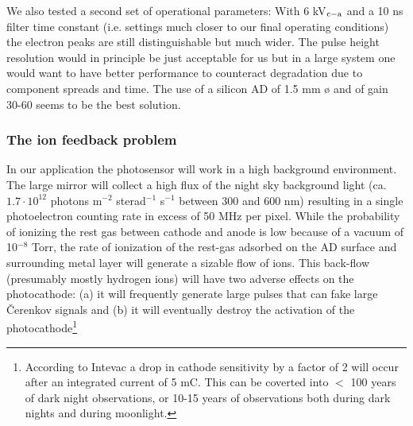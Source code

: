 
We also tested a second set of operational parameters:
With 6 kV$_{{\rm c-a}}$ and a 10 ns filter time constant (i.e.
settings much closer to our final operating conditions) the electron peaks
are still distinguishable but much wider. The pulse height resolution
would in principle be just acceptable for us but
in a large system one would want to have better performance to counteract
degradation due to component spreads and time. The use of a silicon AD of
1.5 mm {\o} and of gain 30-60 seems to be the best solution.

\subsubsection{The ion feedback problem}


\medskip In our application the photosensor will work in a high background
environment. The large mirror will collect a high flux of the night sky
background light (ca. $1.7 \cdot 10^{12}$ photons m$^{-2}$ sterad$^{-1}$ s$%
^{-1}$ between 300 and 600 nm) resulting in a single photoelectron counting
rate in excess of 50 MHz per pixel. While the probability of ionizing the rest gas
between cathode and anode is low because of a vacuum of 10$^{-8}$ Torr, the
rate of ionization of the rest-gas adsorbed on the AD surface and
surrounding metal layer will generate a sizable flow of ions. This
back-flow (presumably mostly hydrogen ions) will have two adverse effects on
the photocathode: (a) it will frequently generate large pulses that can fake
large \v{C}erenkov signals \cite{mirzoyan:94} and (b) it will 
eventually destroy the
activation of the photocathode\footnote{According to Intevac a drop in 
cathode sensitivity by a factor of 2 will occur after an integrated current
of 5 mC. This can be coverted into $<$ 100 years of dark night
observations, or 10-15 years of observations both during
dark nights and during moonlight.}

